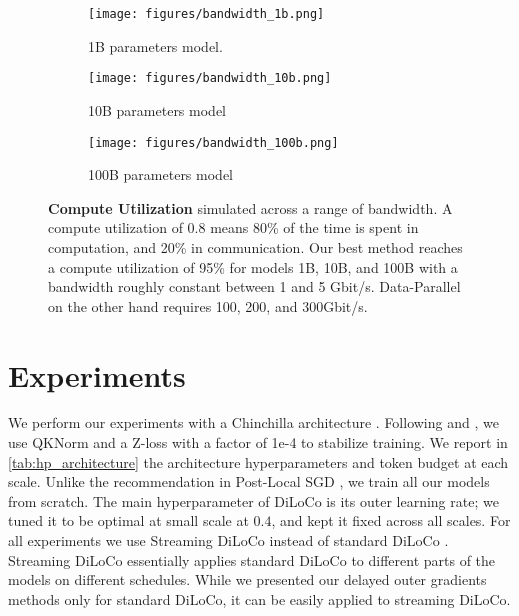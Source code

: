 \begin{figure*}[t]
\centering
\captionsetup[subfigure]{justification=centering}
\begin{subfigure}{0.325\linewidth}
  \centering
  \texttt{[image: figures/bandwidth\_1b.png]}
  \caption{1B parameters model.}
  \label{fig:bandwdith_1b}
\end{subfigure}\hfill
\begin{subfigure}{0.325\linewidth}
  \centering
  \texttt{[image: figures/bandwidth\_10b.png]}
  \caption{10B parameters model}
  \label{fig:bandwdith_1b}
\end{subfigure}\hfill
\begin{subfigure}{0.325\linewidth}
  \centering
  \texttt{[image: figures/bandwidth\_100b.png]}
  \caption{100B parameters model}
  \label{fig:bandwdith_100b}
\end{subfigure}
\caption{\textbf{Compute Utilization} simulated across a range of bandwidth. A compute utilization of 0.8 means 80\% of the time is spent in computation, and 20\% in communication. Our best method reaches a compute utilization of 95\% for models 1B, 10B, and 100B with a bandwidth roughly constant between 1 and 5 Gbit/s. Data-Parallel on the other hand requires 100, 200, and 300Gbit/s.}
\label{fig:bandwdith}
\end{figure*}

\section{Experiments}\label{sec:experiments}


We perform our experiments with a Chinchilla architecture \citep{hoffmann2022chinchilla}. Following \cite{wortsman2023smallscaleproxieslargescaletransformer} and \cite{jaghouar2024intellect1}, we use QKNorm \citep{henry2020querykeynormalization} and a Z-loss \citep{chowdhery2023palm} with a factor of 1e-4 to stabilize training. We report in \autoref{tab:hp_architecture} the architecture hyperparameters and token budget at each scale. Unlike the recommendation in Post-Local SGD \citep{Lin2020_localsgd}, we train all our models from scratch. The main hyperparameter of DiLoCo is its outer learning rate; we tuned it to be optimal at small scale at $0.4$, and kept it fixed across all scales. For all experiments we use Streaming DiLoCo \citep{douillard2025streamingdiloco} instead of standard DiLoCo \citep{douillard2023diloco}. Streaming DiLoCo essentially applies standard DiLoCo to different parts of the models on different schedules. While we presented our delayed outer gradients methods only for standard DiLoCo, it can be easily applied to streaming DiLoCo.

